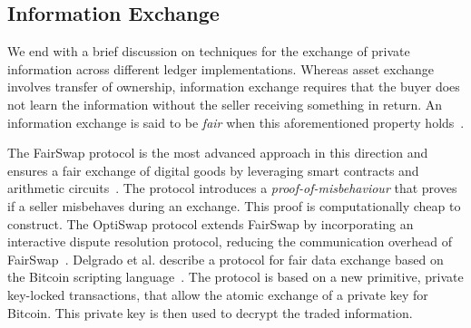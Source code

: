 \subsection{Information Exchange}
We end with a brief discussion on techniques for the exchange of private information across different ledger implementations.
Whereas asset exchange involves transfer of ownership, information exchange requires that the buyer does not learn the information without the seller receiving something in return.
An information exchange is said to be \emph{fair} when this aforementioned property holds~\cite{asokan1997optimistic}.

The FairSwap protocol is the most advanced approach in this direction and ensures a fair exchange of digital goods by leveraging smart contracts and arithmetic circuits~\cite{dziembowski2018fairswap}.
The protocol introduces a \emph{proof-of-misbehaviour} that proves if a seller misbehaves during an exchange.
This proof is computationally cheap to construct.
The OptiSwap protocol extends FairSwap by incorporating an interactive dispute resolution protocol, reducing the communication overhead of FairSwap~\cite{eckey2020optiswap}.
Delgrado et al. describe a protocol for fair data exchange based on the Bitcoin scripting language~\cite{delgado2020fair}.
The protocol is based on a new primitive, private key-locked transactions, that allow the atomic exchange of a private key for Bitcoin.
This private key is then used to decrypt the traded information.

